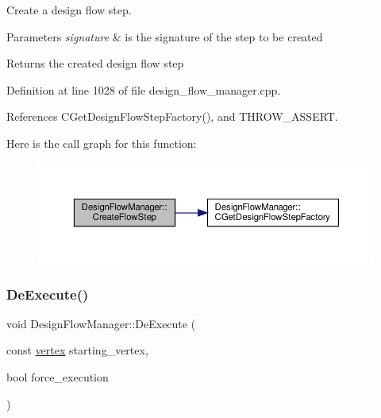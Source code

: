 Create a design flow step. 


\begin{DoxyParams}{Parameters}
{\em signature} & is the signature of the step to be created \\
\hline
\end{DoxyParams}
\begin{DoxyReturn}{Returns}
the created design flow step 
\end{DoxyReturn}


Definition at line 1028 of file design\+\_\+flow\+\_\+manager.\+cpp.



References C\+Get\+Design\+Flow\+Step\+Factory(), and T\+H\+R\+O\+W\+\_\+\+A\+S\+S\+E\+RT.

Here is the call graph for this function\+:
\nopagebreak
\begin{figure}[H]
\begin{center}
\leavevmode
\includegraphics[width=350pt]{de/d63/classDesignFlowManager_a163f98e734cb159907e23c3f6f9abda9_cgraph}
\end{center}
\end{figure}
\mbox{\label{classDesignFlowManager_ac61f3e68a4afd29ca8c5667eb4fc3e81}} 
\subsubsection{\texorpdfstring{De\+Execute()}{DeExecute()}}
{\footnotesize\ttfamily void Design\+Flow\+Manager\+::\+De\+Execute (\begin{DoxyParamCaption}\item[{const \hyperlink{graph_8hpp_abefdcf0544e601805af44eca032cca14}{vertex}}]{starting\+\_\+vertex,  }\item[{bool}]{force\+\_\+execution }\end{DoxyParamCaption})\hspace{0.3cm}{\ttfamily [private]}}



